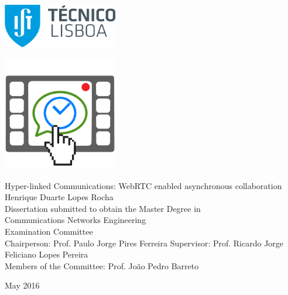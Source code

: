 \thispagestyle{empty}

\includegraphics[width=5.0cm]{Logo.png}

\begin{center}
%
\vspace{0.3cm}
\hspace{-0.5cm}\includegraphics[height=50mm]{Figures/logo.png}

\vspace{0.8cm}
{\FontLb Hyper-linked Communications: WebRTC enabled asynchronous collaboration} \\
\vspace{2.6cm}
{\FontMb Henrique Duarte Lopes Rocha} \\
\vspace{1.9cm}
{\FontLn Dissertation submitted to obtain the Master Degree in} \\
\vspace{0.3cm}
{\FontLb Communications Networks Engineering} \\
\vspace{1.9cm}
{\FontMb Examination Committee} \\
\vspace{0.3cm}
{\FontSn %
Chairperson: 	   Prof. Paulo Jorge Pires Ferreira
Supervisor:        Prof. Ricardo Jorge Feliciano Lopes Pereira \\
Members of the Committee: Prof. João Pedro Barreto
}
\vspace{1.5cm}

{\FontMb May 2016} \\
%
\end{center}

\cleardoublepage

\restoregeometry
